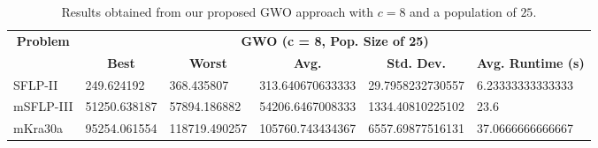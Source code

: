 \begin{table}[h!]
\begin{adjustwidth}{-1.18in}{}
	\centering
	\begin{tabular}{|l|l|l|l|l|l|}
	\hline
	\multicolumn{1}{|c|}{\multirow{2}{*}{\textbf{Problem}}} & \multicolumn{5}{c|}{\textbf{GWO (c = 8, Pop. Size of 25)}} \\ \cline{2-6} 
	\multicolumn{1}{|c|}{}                                  & \multicolumn{1}{c|}{\textbf{Best}} & \multicolumn{1}{c|}{\textbf{Worst}} & \multicolumn{1}{c|}{\textbf{Avg.}} & \multicolumn{1}{c|}{\textbf{Std. Dev.}} & \multicolumn{1}{c|}{\textbf{Avg. Runtime (s)}} \\ \hline
	SFLP-II                                                 & 249.624192                                  & 368.435807                                   & 313.640670633333                     & 29.7958232730557                                 & 6.23333333333333                                  \\ \hline
	mSFLP-III                                               & 51250.638187                                & 57894.186882                                 & 54206.6467008333						         & 1334.40810225102                              & 23.6                               \\ \hline
	mKra30a                                               & 95254.061554                                & 118719.490257                                 &
	105760.743434367							&
	6557.69877516131							&
	37.0666666666667						\\ \hline
	\end{tabular}
\end{adjustwidth}
\caption{Results obtained from our proposed GWO approach with $c = 8$ and a population of $25$.}
\label{approach-gwo-c8-p25-results}
\end{table}

